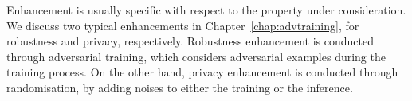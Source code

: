 \begin{partbacktext}
Enhancement is usually specific with respect to the property under consideration. We discuss two typical enhancements in Chapter~\ref{chap:advtraining}, for robustness and privacy, respectively. Robustness enhancement is conducted through adversarial training, which considers adversarial examples during the training process. On the other hand, privacy enhancement is conducted through randomisation, by adding noises to either the training or the inference. 

\end{partbacktext}